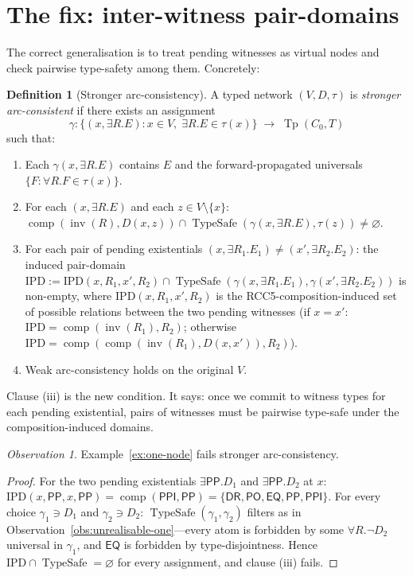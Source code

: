 \documentclass[11pt]{article}
\theoremstyle{definition}
\newtheorem{definition}[theorem]{Definition}
\theoremstyle{remark}
\newtheorem{observation}[theorem]{Observation}
\newcommand{\DR}{\mathsf{DR}}
\newcommand{\PO}{\mathsf{PO}}
\newcommand{\PP}{\mathsf{PP}}
\newcommand{\PPI}{\mathsf{PPI}}
\newcommand{\EQ}{\mathsf{EQ}}
\newcommand{\RCCall}{\{\DR,\PO,\EQ,\PP,\PPI\}}
\newcommand{\Tp}{\operatorname{Tp}}
\newcommand{\comp}{\operatorname{comp}}
\newcommand{\inv}{\operatorname{inv}}
\newcommand{\TypeSafe}{\operatorname{TypeSafe}}
\begin{document}
\section{The fix: inter-witness pair-domains}
\label{sec:fix}

The correct generalisation is to treat pending witnesses as virtual
nodes and check pairwise type-safety among them.  Concretely:

\begin{definition}[Stronger arc-consistency]
\label{def:stronger}
A typed network $(V, D, \tau)$ is \emph{stronger arc-consistent} if
there exists an assignment
\[
  \gamma : \{(x, \exists R. E) : x \in V, \; \exists R. E \in \tau(x)\}
  \;\longrightarrow\; \Tp(C_0, T)
\]
such that:
\begin{enumerate}
  \item[(i)] Each $\gamma(x, \exists R. E)$ contains $E$ and the
    forward-propagated universals $\{F : \forall R. F \in \tau(x)\}$.
  \item[(ii)] For each $(x, \exists R. E)$ and each $z \in V
    \setminus \{x\}$: $\comp(\inv(R), D(x, z)) \cap
    \TypeSafe(\gamma(x, \exists R. E), \tau(z)) \neq \varnothing$.
  \item[(iii)] For each pair of pending existentials $(x, \exists
    R_1. E_1) \neq (x', \exists R_2. E_2)$: the induced pair-domain
    $\mathrm{IPD} := \mathrm{IPD}(x, R_1, x', R_2) \cap
    \TypeSafe(\gamma(x, \exists R_1. E_1),
    \gamma(x', \exists R_2. E_2))$ is non-empty, where
    $\mathrm{IPD}(x, R_1, x', R_2)$ is the RCC5-composition-induced
    set of possible relations between the two pending witnesses
    (if $x = x'$: $\mathrm{IPD} = \comp(\inv(R_1), R_2)$; otherwise
    $\mathrm{IPD} = \comp(\comp(\inv(R_1), D(x, x')), R_2)$).
  \item[(iv)] Weak arc-consistency holds on the original $V$.
\end{enumerate}
\end{definition}

Clause (iii) is the new condition.  It says: once we commit to
witness types for each pending existential, pairs of witnesses must
be pairwise type-safe under the composition-induced domains.

\begin{observation}
Example~\ref{ex:one-node} fails stronger arc-consistency.
\end{observation}

\begin{proof}
For the two pending existentials $\exists \PP. D_1$ and $\exists
\PP. D_2$ at $x$: $\mathrm{IPD}(x, \PP, x, \PP) = \comp(\PPI, \PP)
= \RCCall$.  For every choice $\gamma_1 \ni D_1$ and $\gamma_2 \ni
D_2$: $\TypeSafe(\gamma_1, \gamma_2)$ filters as in
Observation~\ref{obs:unrealisable-one}---every atom is forbidden by
some $\forall R. \neg D_2$ universal in $\gamma_1$, and $\EQ$ is
forbidden by type-disjointness.  Hence $\mathrm{IPD} \cap
\TypeSafe = \varnothing$ for every assignment, and clause (iii)
fails.
\end{proof}
\end{document}
